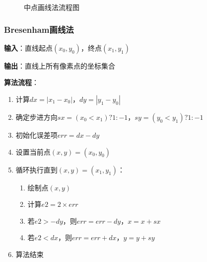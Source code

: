 \documentclass[12pt,a4paper]{article}
\begin{document}
\begin{tcolorbox}
\begin{figure}[H]
\caption{中点画线法流程图}
\label{fig:midpoint_line}
\end{figure}

\subsubsection{Bresenham画线法}

\textbf{输入}：直线起点$(x_0, y_0)$，终点$(x_1, y_1)$

\textbf{输出}：直线上所有像素点的坐标集合

\textbf{算法流程}：
\begin{enumerate}
    \item 计算$dx = |x_1 - x_0|$，$dy = |y_1 - y_0|$
    \item 确定步进方向$sx = (x_0 < x_1) ? 1 : -1$，$sy = (y_0 < y_1) ? 1 : -1$
    \item 初始化误差项$err = dx - dy$
    \item 设置当前点$(x, y) = (x_0, y_0)$
    \item 循环执行直到$(x, y) = (x_1, y_1)$：
    \begin{enumerate}
        \item 绘制点$(x, y)$
        \item 计算$e2 = 2 \times err$
        \item 若$e2 > -dy$，则$err = err - dy$，$x = x + sx$
        \item 若$e2 < dx$，则$err = err + dx$，$y = y + sy$
    \end{enumerate}
    \item 算法结束
\end{enumerate}


\end{tcolorbox}
\end{document}

